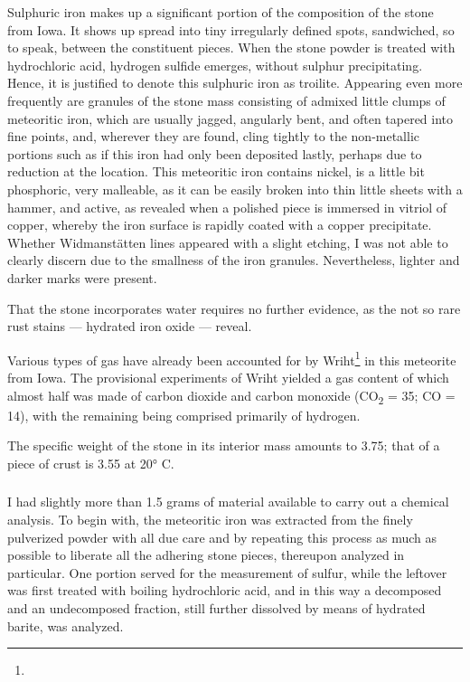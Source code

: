 \documentclass[a4paper, 12pt, oneside]{article}
\begin{document}
Sulphuric iron makes up a significant portion of the composition of the stone from Iowa. It shows up spread into tiny irregularly defined spots, sandwiched, so to speak, between the constituent pieces. When the stone powder is treated with hydrochloric acid, hydrogen sulfide emerges, without sulphur precipitating. Hence, it is justified to denote this sulphuric iron as troilite. Appearing even more frequently are granules of the stone mass consisting of admixed little clumps of meteoritic iron, which are usually jagged, angularly bent, and often tapered into fine points, and, wherever they are found, cling tightly to the non-metallic portions such as if this iron had only been deposited lastly, perhaps due to reduction at the location. This meteoritic iron contains nickel, is a little bit phosphoric, very malleable, as it can be easily broken into thin little sheets with a hammer, and active, as revealed when a polished piece is immersed in vitriol of copper, whereby the iron surface is rapidly coated with a copper precipitate. Whether Widmanstätten lines appeared with a slight etching, I was not able to clearly discern due to the smallness of the iron granules. Nevertheless, lighter and darker marks were present.

That the stone incorporates water requires no further evidence, as the not so rare rust stains --- hydrated iron oxide --- reveal.

Various types of gas have already been accounted for by Wriht\footnote{} in this meteorite from Iowa. The provisional experiments of Wriht yielded a gas content of which almost half was made of carbon dioxide and carbon monoxide (CO\textsubscript{2} = 35; CO = 14), with the remaining being comprised primarily of hydrogen.

The specific weight of the stone in its interior mass amounts to 3.75; that of a piece of crust is 3.55 at 20° C.
\clearpage
\subsubsection{}
\paragraph*{}
I had slightly more than 1.5 grams of material available to carry out a chemical analysis. To begin with, the meteoritic iron was extracted from the finely pulverized powder with all due care and by repeating this process as much as possible to liberate all the adhering stone pieces, thereupon analyzed in particular. One portion served for the measurement of sulfur, while the leftover was first treated with boiling hydrochloric acid, and in this way a decomposed and an undecomposed fraction, still further dissolved by means of hydrated barite, was analyzed.
\end{document}
